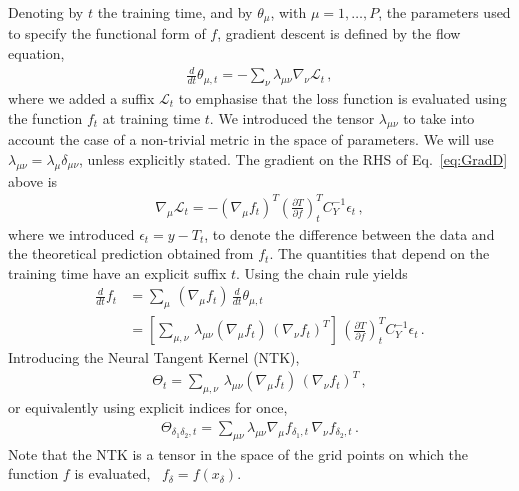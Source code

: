 \documentclass[11pt]{article}
\begin{document}
Denoting by $t$ the training time, and by $\theta_\mu$, with $\mu=1, \dots, P$, the parameters used to specify 
the functional form of $f$, gradient descent is defined by the flow equation, 
\begin{align}
    \label{eq:GradD}
    \frac{d}{dt} \theta_{\mu,t} = - \sum_{\nu} \lambda_{\mu\nu} \nabla_\nu \mathcal{L}_t\, , 
\end{align}
where we added a suffix $\mathcal{L}_t$ to emphasise that the loss function is evaluated using the function $f_t$ at training time $t$. 
We introduced the tensor $\lambda_{\mu\nu}$ to take into account the case of a non-trivial metric in the space of parameters. We will use $\lambda_{\mu\nu} = \lambda_{\mu} \delta_{\mu\nu}$, 
unless explicitly stated.
The gradient on the RHS of Eq.~\ref{eq:GradD} above is
\begin{align}
    \label{eq:GradStepOne}
    \nabla_\mu \mathcal{L}_t = 
        - \left(\nabla_\mu f_t\right)^T \left(\frac{\partial T}{\partial f}\right)_t^T 
        C_Y^{-1} \epsilon_t\, ,
\end{align}
where we introduced $\epsilon_t=y-T_t$, to denote the difference between the data and the theoretical prediction obtained from $f_t$. 
The quantities that depend on the training time have an explicit suffix $t$. Using the chain rule yields
\begin{align}
    \frac{d}{dt} f_t 
        \label{eq:NtkOne}
        &=  \sum_{\mu}\, \left(\nabla_{\mu} f_t\right) \, \frac{d}{dt} \theta_{\mu,t} \\
        \label{eq:NtkTwo}
        &=  \left[\sum_{\mu,\nu}\, \lambda_{\mu\nu} \left(\nabla_\mu f_t\right)\, 
                    \left(\nabla_\nu f_t\right)^T\right]\,  
                \left(\frac{\partial T}{\partial f}\right)_t^T C_Y^{-1} \epsilon_t\, .
\end{align}
Introducing the Neural Tangent Kernel (NTK), 
\begin{align}
    \label{eq:NTKDefNoIndices}
    \Theta_t = \sum_{\mu,\nu}\, \lambda_{\mu\nu} \left(\nabla_\mu f_t\right)\, 
        \left(\nabla_\nu f_t\right)^T\, ,
\end{align}
or equivalently using explicit indices for once,
\begin{align}
    \label{eq:NTKDef}
    \Theta_{\delta_1\delta_2,t} = \sum_{\mu\nu} \lambda_{\mu\nu} \nabla_\mu f_{\delta_1,t}\, \nabla_\nu f_{\delta_2,t}\, .
\end{align}
Note that the NTK is a tensor in the space of the grid points on which the function $f$ is evaluated, \ie \
$f_{\delta} = f(x_\delta)$.
\end{document}
